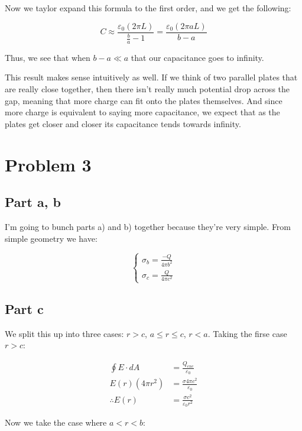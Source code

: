 \documentclass{article}
\theoremstyle{definition}
\numberwithin{equation}{section}
\numberwithin{definition}{section}
\begin{document}
    Now we taylor expand this formula to the first order, and we get the following:

    \[ C \approx \frac{\varepsilon_0 (2\pi L)}{\frac{b}{a}-1} = \frac{\varepsilon_0(2\pi aL)}{b-a}\]

    Thus, we see that when $b-a \ll a$ that our capacitance goes to infinity. 

    \medskip

    This result makes sense intuitively as well. If we think of two parallel plates that are really close together, then there isn't really much potential drop across the gap, meaning that more charge can fit onto the plates themselves. And since more charge is equivalent to saying more capacitance, we expect that as the plates get closer and closer its capacitance tends towards infinity.


    \section{Problem 3}

    \subsection{Part a, b} 

    I'm going to bunch parts a) and b) together because they're very simple. From simple geometry we have:

    \[ \begin{cases}
        \sigma_b = \frac{-Q}{4\pi b^2}\\
        \sigma_c = \frac{Q}{4\pi c^2}
    \end{cases}\]

    \subsection{Part c}

    We split this up into three cases: $r > c$, $a \le r \le c$, $r < a$. Taking the firse case $r > c$: 

    \begin{align*}
        \oint E \cdot dA &= \frac{Q_{enc}}{\varepsilon_0}\\
        E(r) (4\pi r^2) &= \frac{\sigma 4\pi c^2}{\varepsilon_0}\\
        \therefore E(r) &= \frac{\sigma c^2}{\varepsilon_0 r^2}
    \end{align*}

    Now we take the case where $a < r < b$: 
\end{document}
